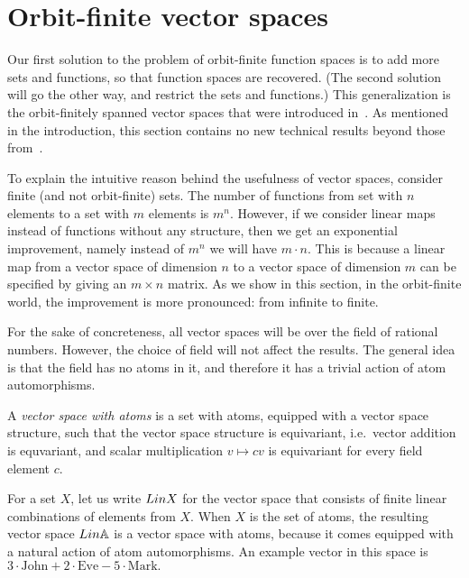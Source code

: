 \section{Orbit-finite vector spaces}
Our first solution to the problem of orbit-finite function spaces is to add more sets and functions, so that function spaces are recovered. (The second solution will go the other way, and restrict the sets and functions.) 
This generalization is the orbit-finitely spanned vector spaces that were introduced in~\cite{bojanczykKM21OrbitFiniteVector}. As mentioned in the introduction,  this section contains no new technical results beyond those from~\cite{bojanczykKM21OrbitFiniteVector}. 

To explain the intuitive reason behind the usefulness of vector spaces, consider finite (and not orbit-finite) sets. The number of functions from set with $n$ elements to a set with $m$ elements is $m^n$. However, if we consider linear maps instead of functions without any structure, then we get an exponential improvement, namely instead of $m^n$ we will have $m \cdot n$. 
This is because a linear map from a vector space of dimension $n$ to a vector space of dimension $m$ can be specified by giving an $m \times n$ matrix. As we show in this section,  in the orbit-finite world, the improvement is more pronounced: from infinite to finite.

For the sake of concreteness, all  vector spaces will be over the field of rational numbers. However, the choice of field will not affect the results. The general idea is that the field has no atoms in it, and therefore it has a trivial action of atom automorphisms. 
\begin{definition}
    A \emph{vector space with atoms} is a set with atoms, equipped with a vector space structure, such that the vector space structure is equivariant, i.e.~vector addition is equvariant, and  scalar multiplication $v \mapsto cv$ is equivariant for every field element $c$.
\end{definition}


\begin{example} \label{ex:lina} For a set $X$, let us write $\Lin X$ for the vector space that consists of finite linear combinations of elements from $X$. When $X$ is the set of atoms, the resulting vector space $\Lin \atoms$ is a vector space with atoms, because it comes equipped with a natural action of atom automorphisms.  An example vector in this space is $
3 \cdot \text{John} + 2 \cdot \text{Eve} - 5 \cdot \text{Mark}.
$
\end{example}

